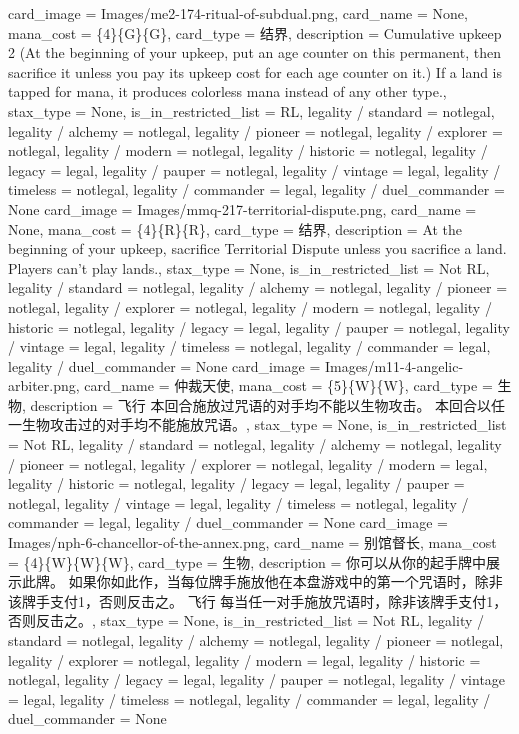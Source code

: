 \documentclass[lang = cn, color = black, 10pt]{AllThatStax}
\begin{document}
\card
{
	card_image = Images/me2-174-ritual-of-subdual.png,
	card_name = None,
	mana_cost = \{4\}\{G\}\{G\},
	card_type = 结界,
	description = Cumulative upkeep {2} (At the beginning of your upkeep, put an age counter on this permanent, then sacrifice it unless you pay its upkeep cost for each age counter on it.)
	If a land is tapped for mana, it produces colorless mana instead of any other type.,
	stax_type = None,
	is_in_restricted_list = RL,
	legality / standard = notlegal,
	legality / alchemy = notlegal,
	legality / pioneer = notlegal,
	legality / explorer = notlegal,
	legality / modern = notlegal,
	legality / historic = notlegal,
	legality / legacy = legal,
	legality / pauper = notlegal,
	legality / vintage = legal,
	legality / timeless = notlegal,
	legality / commander = legal,
	legality / duel_commander = None
}
\card
{
	card_image = Images/mmq-217-territorial-dispute.png,
	card_name = None,
	mana_cost = \{4\}\{R\}\{R\},
	card_type = 结界,
	description = At the beginning of your upkeep, sacrifice Territorial Dispute unless you sacrifice a land.
	Players can't play lands.,
	stax_type = None,
	is_in_restricted_list = Not RL,
	legality / standard = notlegal,
	legality / alchemy = notlegal,
	legality / pioneer = notlegal,
	legality / explorer = notlegal,
	legality / modern = notlegal,
	legality / historic = notlegal,
	legality / legacy = legal,
	legality / pauper = notlegal,
	legality / vintage = legal,
	legality / timeless = notlegal,
	legality / commander = legal,
	legality / duel_commander = None
}
\card
{
	card_image = Images/m11-4-angelic-arbiter.png,
	card_name = 仲裁天使,
	mana_cost = \{5\}\{W\}\{W\},
	card_type = 生物,
	description = 飞行
	本回合施放过咒语的对手均不能以生物攻击。
	本回合以任一生物攻击过的对手均不能施放咒语。,
	stax_type = None,
	is_in_restricted_list = Not RL,
	legality / standard = notlegal,
	legality / alchemy = notlegal,
	legality / pioneer = notlegal,
	legality / explorer = notlegal,
	legality / modern = legal,
	legality / historic = notlegal,
	legality / legacy = legal,
	legality / pauper = notlegal,
	legality / vintage = legal,
	legality / timeless = notlegal,
	legality / commander = legal,
	legality / duel_commander = None
}
\card
{
	card_image = Images/nph-6-chancellor-of-the-annex.png,
	card_name = 别馆督长,
	mana_cost = \{4\}\{W\}\{W\}\{W\},
	card_type = 生物,
	description = 你可以从你的起手牌中展示此牌。 如果你如此作，当每位牌手施放他在本盘游戏中的第一个咒语时，除非该牌手支付{1}，否则反击之。
	飞行
	每当任一对手施放咒语时，除非该牌手支付{1}，否则反击之。,
	stax_type = None,
	is_in_restricted_list = Not RL,
	legality / standard = notlegal,
	legality / alchemy = notlegal,
	legality / pioneer = notlegal,
	legality / explorer = notlegal,
	legality / modern = legal,
	legality / historic = notlegal,
	legality / legacy = legal,
	legality / pauper = notlegal,
	legality / vintage = legal,
	legality / timeless = notlegal,
	legality / commander = legal,
	legality / duel_commander = None
}
\end{document}
